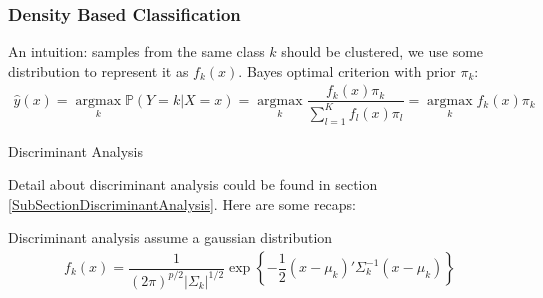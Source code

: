 \subsubsection{Density Based Classification}

    An intuition: samples from the same class $ k $ should be clustered, we use some distribution to represent it as $ f_k(x) $. Bayes optimal criterion with prior $ \pi_k $:
    \begin{align}
        \hat{y}(x)=\mathop{\arg\max}\limits_{k} \mathbb{P}\left( Y=k|X=x \right)=\mathop{\arg\max}\limits_{k}\dfrac{f_k(x)\pi_k}{\sum_{l=1}^Kf_l(x)\pi_l} =\mathop{\arg\max}\limits_{k} f_k(x)\pi_k
    \end{align}
    
\begin{point}
    Discriminant Analysis
\end{point}

    Detail about discriminant analysis could be found in section \autoref{SubSectionDiscriminantAnalysis}. Here are some recaps:

    Discriminant analysis assume a gaussian distribution
    \begin{align}
        f_k(x)=\dfrac{1}{(2\pi)^{p/2}|\Sigma _k|^{1/2}}\exp\left\{ -\dfrac{1}{2}(x-\mu _k)'\Sigma _k^{-1}(x-\mu _k) \right\}
    \end{align}    
    

